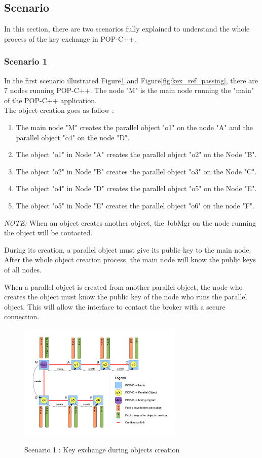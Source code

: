 \pagebreak
\subsection{Scenario}
In this section, there are two scenarios fully explained to understand the whole process of the key exchange in POP-C++. 

\subsubsection{Scenario 1}
In the first scenario illustrated Figure\ref{fig:kex_object_creation} and Figure\ref{fig:kex_ref_passing}, there are 7 nodes running POP-C++. The node "M" is the main node running the "main" of the POP-C++ application.\\
The object creation goes as follow : \s

\begin{enumerate}
\item The main node "M" creates the parallel object "o1" on the node "A" and the parallel object "o4" on the node "D".
\item The object "o1" in Node "A" creates the parallel object "o2" on the Node "B".
\item The object "o2" in Node "B" creates the parallel object "o3" on the Node "C".
\item The object "o4" in Node "D" creates the parallel object "o5" on the Node "E".
\item The object "o5" in Node "E" creates the parallel object "o6" on the node "F".
\end{enumerate}\s

\emph{NOTE:} When an object creates another object, the JobMgr on the node running the object will be contacted.\s

During its creation, a parallel object must give its public key to the main node. After the whole object creation process, the main node will know the public keys of all nodes. \s

When a parallel object is created from another parallel object, the node who creates the object must know the public key of the node who runs the parallel object. This will allow the interface to contact the broker with a secure connection.
\begin{figure}[ht]
	\caption{Scenario 1 : Key exchange during objects creation}
  	\centering
	\includegraphics[width=0.7\textwidth]{../object_creation.pdf}
	\label{fig:kex_object_creation}
\end{figure}




